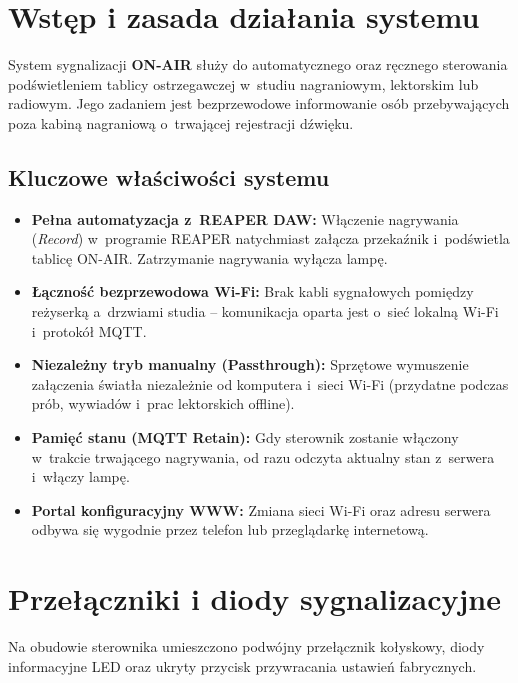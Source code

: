\documentclass[11pt,a4paper]{article}
\begin{document}
\section{Wstęp i zasada działania systemu}

System sygnalizacji \textbf{ON-AIR} służy do automatycznego oraz ręcznego sterowania podświetleniem tablicy ostrzegawczej w~studiu nagraniowym, lektorskim lub radiowym. Jego zadaniem jest bezprzewodowe informowanie osób przebywających poza kabiną nagraniową o~trwającej rejestracji dźwięku.

\subsection{Kluczowe właściwości systemu}
\begin{itemize}[leftmargin=1.5em]
    \item \textbf{Pełna automatyzacja z~REAPER DAW:} Włączenie nagrywania (\textit{Record}) w~programie REAPER natychmiast załącza przekaźnik i~podświetla tablicę ON-AIR. Zatrzymanie nagrywania wyłącza lampę.
    \item \textbf{Łączność bezprzewodowa Wi-Fi:} Brak kabli sygnałowych pomiędzy reżyserką a~drzwiami studia -- komunikacja oparta jest o~sieć lokalną Wi-Fi i~protokół MQTT.
    \item \textbf{Niezależny tryb manualny (Passthrough):} Sprzętowe wymuszenie załączenia światła niezależnie od komputera i~sieci Wi-Fi (przydatne podczas prób, wywiadów i~prac lektorskich offline).
    \item \textbf{Pamięć stanu (MQTT Retain):} Gdy sterownik zostanie włączony w~trakcie trwającego nagrywania, od razu odczyta aktualny stan z~serwera i~włączy lampę.
    \item \textbf{Portal konfiguracyjny WWW:} Zmiana sieci Wi-Fi oraz adresu serwera odbywa się wygodnie przez telefon lub przeglądarkę internetową.
\end{itemize}

\section{Przełączniki i diody sygnalizacyjne}

Na obudowie sterownika umieszczono podwójny przełącznik kołyskowy, diody informacyjne LED oraz ukryty przycisk przywracania ustawień fabrycznych.
\end{document}
